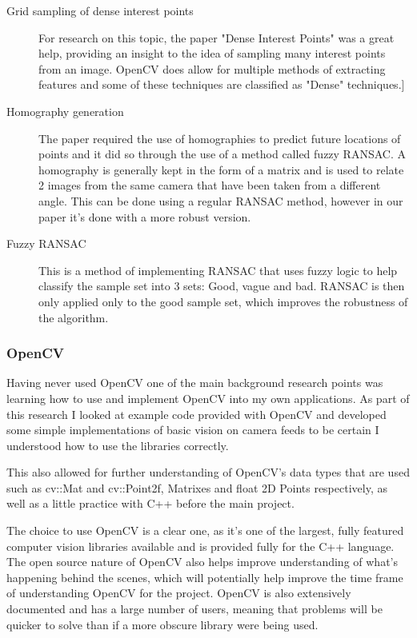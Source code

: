 \begin{description}
	\item [Grid sampling of dense interest points] For research on this topic, the paper "Dense Interest Points"\cite{DenseInterest} was a great help, providing an insight to the idea of sampling many interest points from an image. OpenCV does allow for multiple methods of extracting features and some of these techniques are classified as "Dense" techniques.]
	
	\item [Homography generation] The paper required the use of homographies to predict future locations of points and it did so through the use of a method called fuzzy RANSAC. A homography is generally kept in the form of a matrix and is used to relate 2 images from the same camera that have been taken from a different angle. This can be done using a regular RANSAC method, however in our paper it's done with a more robust version.
	
	\item[Fuzzy RANSAC] This is a method of implementing RANSAC that uses fuzzy logic to help classify the sample set into 3 sets: Good, vague and bad. RANSAC is then only applied only to the good sample set, which improves the robustness of the algorithm.

\end{description}

\subsubsection{OpenCV}
Having never used OpenCV one of the main background research points was learning how to use and implement OpenCV into my own applications. As part of this research I looked at example code provided with OpenCV and developed some simple implementations of basic vision on camera feeds to be certain I understood how to use the libraries correctly.

This also allowed for further understanding of OpenCV's data types that are used such as cv::Mat and cv::Point2f, Matrixes and float 2D Points respectively, as well as a little practice with C++ before the main project.

The choice to use OpenCV is a clear one, as it's one of the largest, fully featured computer vision libraries available and is provided fully for the C++ language. The open source nature of OpenCV also helps improve understanding of what's happening behind the scenes, which will potentially help improve the time frame of understanding OpenCV for the project. OpenCV is also extensively documented and has a large number of users, meaning that problems will be quicker to solve than if a more obscure library were being used.

